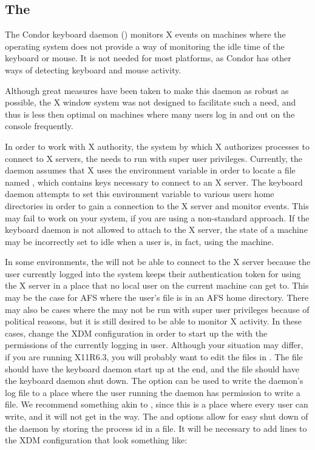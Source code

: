 \subsection{\label{sec:kbdd}The }

The Condor keyboard daemon () monitors X events on
machines where the operating system does not provide a way of
monitoring the idle time of the keyboard or mouse.
It is not needed for most platforms, as Condor has other ways
of detecting keyboard and mouse activity.

Although great measures have been taken to make this daemon as robust
as possible, the X window system was not designed to facilitate such a
need, and thus is less then optimal on machines where many users log
in and out on the console frequently.

In order to work with X authority, the system by which X authorizes
processes to connect to X servers, the  needs to
run with super user privileges.  Currently, the daemon assumes that X
uses the  environment variable in order to locate a file
named , which contains keys necessary to connect to
an X server.  The keyboard daemon attempts to set this environment
variable to various users home directories in order to gain a
connection to the X server and monitor events.  This may fail to work
on your system, if you are using a non-standard approach.  If the
keyboard daemon is not allowed to attach to the X server, the state of
a machine may be incorrectly set to idle when a user is, in fact,
using the machine.

In some environments, the   will not be able to connect to the X
server because the user currently logged into the system keeps their
authentication token for using the X server in a place that no local user on
the current machine can get to.  
This may be the case for AFS where
the user's  file is in an AFS home directory.
There may also
be cases where the   may not be run with super user privileges
because of political reasons,
but it is still desired to be able to monitor X activity.
In these cases, change the XDM configuration in order to
start up the  with the permissions of the currently logging in
user.  Although your situation may differ, if you are running X11R6.3, you
will probably want to edit the files in .
The 
file should have the keyboard daemon start up at the end,
and the  file
should have the keyboard daemon shut down.  
The  option can be used to write the daemon's log file to a
place where the user running the daemon has permission to write a file.  We
recommend something akin to ,
since this is a place where every
user can write, and it will not get in the way.
The  and 
options allow
for easy shut down of the daemon by storing the process id in a file.  
It will be necessary
to add lines to the XDM configuration that look something like:

